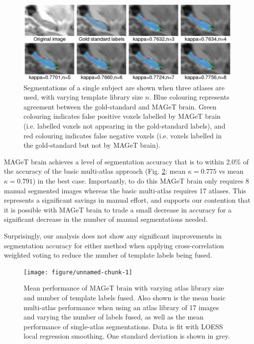 \documentclass{article}\usepackage{graphicx, color}
\newenvironment{knitrout}{}{} %
\begin{document}
\begin{figure}[h]
\begin{minipage}[b]{1.0\linewidth}
  \centering
  \includegraphics[width=\textwidth]{montage.png}
\end{minipage}
\caption{{\small
Segmentations of a single subject are shown when three atlases are used, with
varying template library size $n$. Blue colouring represents agreement between
the gold-standard and MAGeT brain. Green colouring indicates false positive
voxels labelled by MAGeT brain (i.e. labelled voxels not appearing in the
gold-standard labels), and red colouring indicates false negative voxels (i.e.
voxels labelled in the gold-standard but not by MAGeT brain).
}} 
\label{montage}
\end{figure}

MAGeT brain achieves a level of segmentation accuracy that is to within 2.0\%
of the accuracy of the basic multi-atlas approach (Fig. \ref{results};
mean $\kappa = 0.775$ vs mean $\kappa = 0.791$) in the best case. Importantly,
to do this MAGeT brain only requires 8 manual segmented images whereas the
basic multi-atlas requires 17 atlases.  This represents a significant
savings in manual effort, and supports our contention that it is possible with
MAGeT brain to trade a small decrease in accuracy for a significant decrease in
the number of manual segmentations needed. 

Surprisingly, our analysis does not show any significant improvements in
segmentation accuracy for either method when applying cross-correlation
weighted voting to reduce the number of template labels being fused.

\begin{figure}[t]
  \centering
\begin{knitrout}
\color{fgcolor}\texttt{[image: figure/unnamed-chunk-1]} 
\end{knitrout}

\caption{{\small
Mean performance of MAGeT brain with varying atlas library size and number of
template labels fused. Also shown is the mean basic multi-atlas
performance when using an atlas library of 17 images and varying the number of
labels fused, as well as the mean performance of single-atlas segmentations.
Data is fit with LOESS local regression smoothing. One standard deviation is
shown in grey.
}}
\label{results}
\end{figure}
\end{document}
